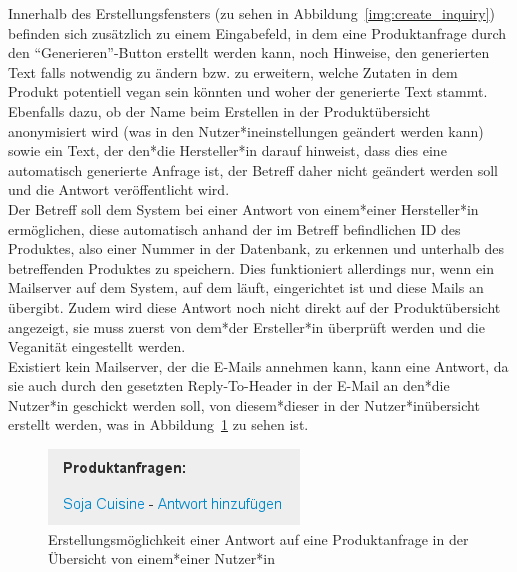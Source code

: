 Innerhalb des Erstellungsfensters (zu sehen in 
Abbildung~\ref{img:create_inquiry}) befinden sich zusätzlich zu einem 
Eingabefeld, in dem eine Produktanfrage durch den "`Generieren"'-Button erstellt 
werden kann, noch Hinweise, den generierten Text falls notwendig zu ändern bzw. 
zu erweitern, welche Zutaten in dem Produkt potentiell
vegan sein könnten und woher der generierte Text stammt.
Ebenfalls dazu, ob der Name beim
Erstellen in der Produktübersicht anonymisiert wird (was in den 
Nutzer*ineinstellungen geändert werden kann)
sowie ein Text, der den*die Hersteller*in darauf hinweist, dass dies
eine automatisch generierte Anfrage ist, der Betreff daher nicht geändert
werden soll und die Antwort veröffentlicht wird.\\
Der Betreff soll dem System bei einer Antwort von einem*einer Hersteller*in 
ermöglichen, diese automatisch anhand der im Betreff befindlichen ID des 
Produktes, also einer Nummer in der Datenbank, zu erkennen und unterhalb des 
betreffenden Produktes zu speichern. Dies funktioniert allerdings nur, wenn ein 
Mailserver auf dem System, auf dem \name läuft, eingerichtet ist und diese 
Mails an \name übergibt. Zudem wird diese Antwort noch nicht direkt auf der 
Produktübersicht angezeigt, sie muss zuerst von dem*der Ersteller*in 
überprüft werden und die Veganität eingestellt werden.\\
Existiert kein Mailserver, der die E-Mails annehmen kann, kann eine Antwort, da 
sie auch durch den gesetzten Reply-To-Header in der E-Mail an den*die Nutzer*in 
geschickt werden soll, von diesem*dieser in der Nutzer*inübersicht erstellt 
werden, was in Abbildung~\ref{img:create_inquiry_2} zu sehen ist.

\begin{figure}[ht]
  \centering
  \includegraphics[scale=0.5]{pics/create_inquiry_2.png}
  \caption{Erstellungsmöglichkeit einer Antwort auf eine Produktanfrage in der 
Übersicht von einem*einer Nutzer*in}
  \label{img:create_inquiry_2}
\end{figure}

